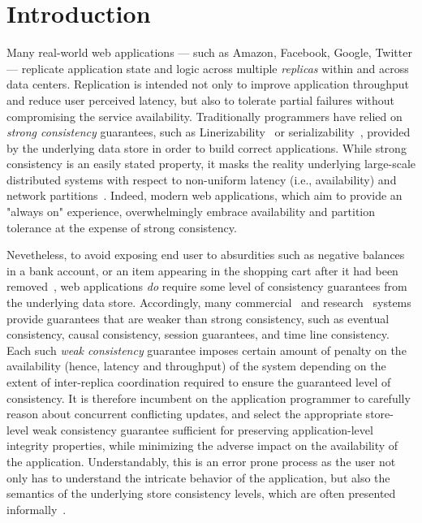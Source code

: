 \section{Introduction}
\label{sec:intro}

Many real-world web applications --- such as Amazon, Facebook, Google, Twitter
--- replicate application state and logic across multiple \emph{replicas} within
and across data centers. Replication is intended not only to improve application
throughput and reduce user perceived latency, but also to tolerate partial
failures without compromising the service availability. Traditionally
programmers have relied on \emph{strong consistency} guarantees, such as
Linerizability~\cite{Herlihy1990} or serializability~\cite{Serializability},
provided by the underlying data store in order to build correct applications.
While strong consistency is an easily stated property, it
masks the reality underlying large-scale distributed systems with respect to
non-uniform latency (i.e., availability) and network
partitions~\cite{Brewer2000,Gilbert}. Indeed, modern web applications, which aim to provide
an "always on" experience, overwhelmingly embrace availability and partition
tolerance at the expense of strong consistency. 

Nevetheless, to avoid exposing end user to absurdities such as negative balances
in a bank account, or an item appearing in the shopping cart after it had been
removed~\cite{Dynamo}, web applications \emph{do} require some level of
consistency guarantees from the underlying data store. Accordingly, many
commercial~\cite{} and research~\cite{} systems provide guarantees that are
weaker than strong consistency, such as eventual consistency, causal
consistency, session guarantees, and time line consistency. Each such \emph{weak
consistency} guarantee imposes certain amount of penalty on the availability
(hence, latency and throughput) of the system depending on the extent of
inter-replica coordination required to ensure the guaranteed level of
consistency. It is therefore incumbent on the application programmer to
carefully reason about concurrent conflicting updates, and select the
appropriate store-level weak consistency guarantee sufficient for preserving
application-level integrity properties, while minimizing the adverse impact on
the availability of the application. Understandably, this is an error prone
process as the user not only has to understand the intricate behavior of the
application, but also the semantics of the underlying store consistency levels,
which are often presented informally~\cite{}.

